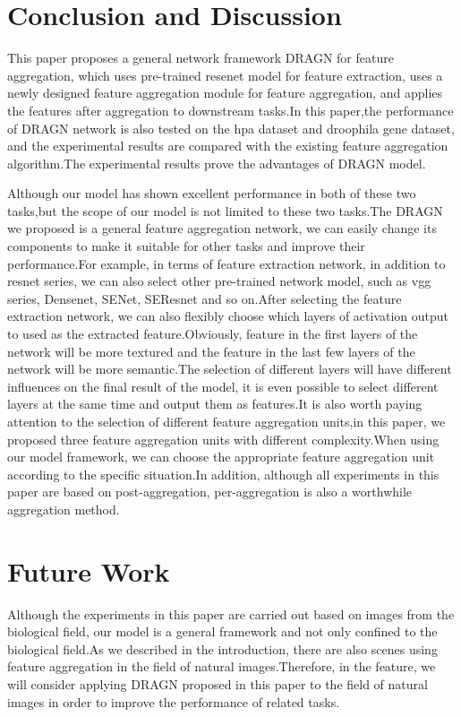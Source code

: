 \documentclass[10pt,twocolumn,letterpaper]{article}
\begin{document}
\section{Conclusion and Discussion}
This paper proposes a general network framework DRAGN for feature aggregation, which uses pre-trained resenet model for feature extraction, uses a newly designed feature aggregation module for feature aggregation, and applies the features after aggregation to downstream tasks.In this paper,the performance of DRAGN network is also tested on the hpa dataset and droophila gene dataset, and the experimental results are compared with the existing feature aggregation algorithm.The experimental results prove the advantages of DRAGN model.

Although our model has shown excellent performance in both of these two tasks,but the scope of our model is not limited to these two tasks.The DRAGN we proposed is a general feature aggregation network, we can easily change its components to make it suitable for other tasks and improve their performance.For example, in terms of feature extraction network, in addition to resnet series, we can also select other pre-trained network model, such as vgg series, Densenet, SENet, SEResnet and so on.After selecting the feature extraction network, we can also flexibly choose which layers of activation output to used as the extracted feature.Obviously, feature in the first layers of the network will be more textured and the feature in the last few layers of the network will be more semantic.The selection of different layers will have different influences on the final result of the model, it is even possible to select different layers at the same time and output them as features.It is also worth paying attention to the selection of different feature aggregation units,in this paper, we proposed three feature aggregation units with different complexity.When using our model framework, we can choose the appropriate feature aggregation unit according to the specific situation.In addition, although all experiments in this paper are based on post-aggregation, per-aggregation is also a worthwhile aggregation method.

\section{Future Work}
Although the experiments in this paper are carried out based on images from the biological field, our model is a general framework and not only confined to the biological field.As we described in the introduction, there are also scenes using feature aggregation in the field of natural images.Therefore, in the feature, we will consider applying DRAGN proposed in this paper to the field of natural images in order to improve the performance of related tasks.
\end{document}
